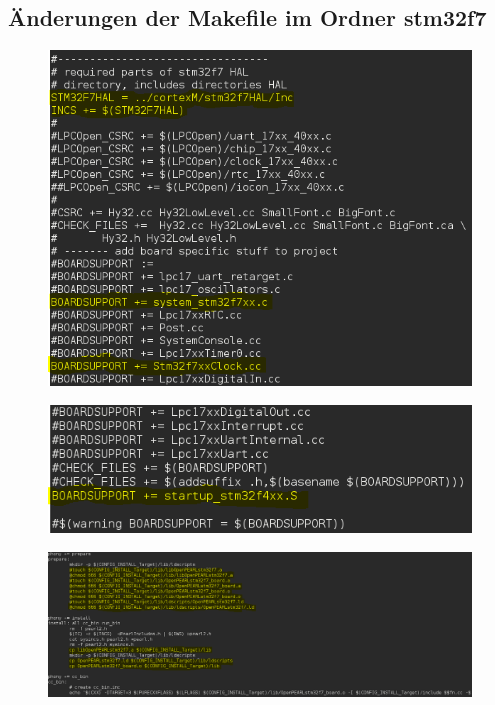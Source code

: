 \documentclass[12pt,a4paper]{article}
\begin{document}
\subsection{Änderungen der Makefile im Ordner stm32f7}\label{Änderungen der Makefile im Ordner stm32f7}
\begin{figure}[h]
\begin{center}
\includegraphics[width=13cm]{grafiken/Makefile_stm32f7_1.png}
\end{center}
\end{figure}

\begin{figure}[h]
\begin{center}
\includegraphics[width=13cm]{grafiken/Makefile_stm32f7_2.png}
\end{center}
\end{figure}
\newpage

\begin{figure}[h]
\begin{center}
\includegraphics[width=35cm]{grafiken/Makefile_stm32f7_3.png}
\end{center}
\end{figure}
\newpage
\end{document}
